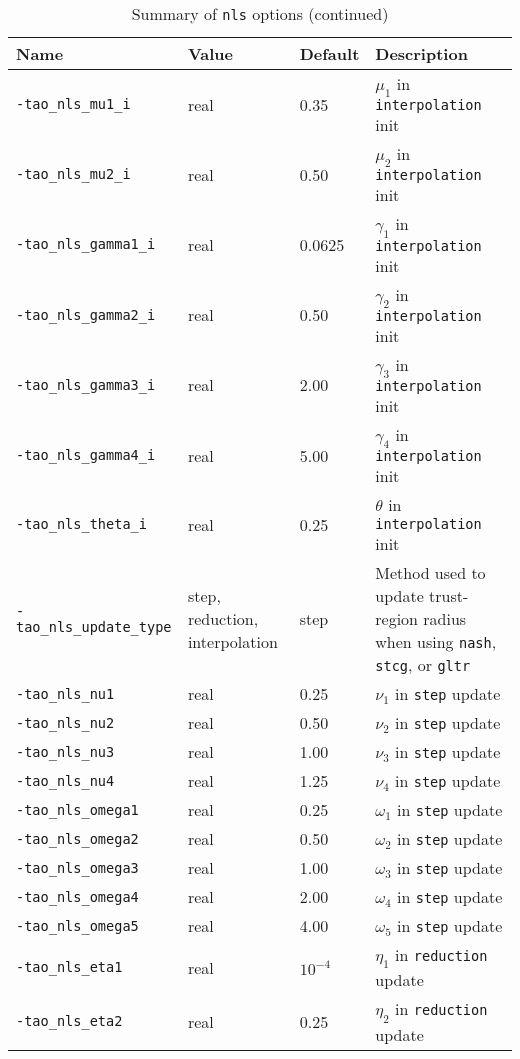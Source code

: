 \begin{table}[h]
\caption{Summary of {\tt nls} options (continued)}
\vspace{5mm}
\begin{tabular}{l|p{1.5in}|l|p{2.0in}}
\hline
Name \rule{0pt}{2.6ex} & Value & Default & Description \\
\hline
{\tt -tao\_nls\_mu1\_i} \rule{0pt}{2.6ex} & real & 0.35 & $\mu_1$ in {\tt interpolation} init \\
{\tt -tao\_nls\_mu2\_i} & real & 0.50 & $\mu_2$ in {\tt interpolation} init \\
{\tt -tao\_nls\_gamma1\_i} & real & 0.0625 & $\gamma_1$ in {\tt interpolation} init \\
{\tt -tao\_nls\_gamma2\_i} & real & 0.50 & $\gamma_2$ in {\tt interpolation} init \\
{\tt -tao\_nls\_gamma3\_i} & real & 2.00 & $\gamma_3$ in {\tt interpolation} init \\
{\tt -tao\_nls\_gamma4\_i} & real & 5.00 & $\gamma_4$ in {\tt interpolation} init \\
{\tt -tao\_nls\_theta\_i} & real & 0.25 & $\theta$ in {\tt interpolation} init \\
{\tt -tao\_nls\_update\_type} & step, reduction, interpolation & step &
Method used to update trust-region radius when using {\tt nash}, {\tt
stcg}, or {\tt gltr} \\
{\tt -tao\_nls\_nu1} & real & 0.25 & $\nu_1$ in {\tt step} update \\
{\tt -tao\_nls\_nu2} & real & 0.50 & $\nu_2$ in {\tt step} update \\
{\tt -tao\_nls\_nu3} & real & 1.00 & $\nu_3$ in {\tt step} update \\
{\tt -tao\_nls\_nu4} & real & 1.25 & $\nu_4$ in {\tt step} update \\
{\tt -tao\_nls\_omega1} & real & 0.25 & $\omega_1$ in {\tt step} update \\
{\tt -tao\_nls\_omega2} & real & 0.50 & $\omega_2$ in {\tt step} update \\
{\tt -tao\_nls\_omega3} & real & 1.00 & $\omega_3$ in {\tt step} update \\
{\tt -tao\_nls\_omega4} & real & 2.00 & $\omega_4$ in {\tt step} update \\
{\tt -tao\_nls\_omega5} & real & 4.00 & $\omega_5$ in {\tt step} update \\
{\tt -tao\_nls\_eta1} & real & $10^{-4}$ & $\eta_1$ in {\tt reduction} update \\
{\tt -tao\_nls\_eta2} & real & 0.25 & $\eta_2$ in {\tt reduction} update \\

\end{tabular}
\end{table}
